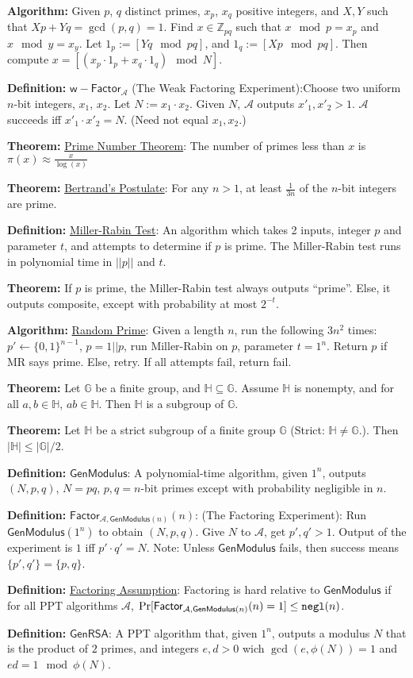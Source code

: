 \documentclass[10pt]{article}
\newcommand{\Z}{\mathbb{Z}}
\newcommand{\G}{\mathbb{G}}
\newcommand{\HH}{\mathbb{H}}
\newcommand{\AAA}{\mathcal{A}}
\newcommand{\defn}[1]{{\bf Definition:} \underline{#1}}
\newcommand{\thm}[1]{{\bf Theorem:} \underline{#1}}
\newcommand{\alg}[1]{{\bf Algorithm:} \underline{#1}}
\newcommand{\GenM}{\mathsf{GenModulus}}
\newcommand{\GenRSA}{\mathsf{GenRSA}}
\newcommand{\ExptFacArgs}[2]{\mathsf{Factor}_{#1,#2}}
\newcommand{\ExptWFacArgs}[1]{\mathsf{w-Factor}_{#1}}
\newcommand{\ExptFac}{\ExptFacArgs{\AAA}{\GenM(n)}}
\newcommand{\ExptWFac}{\ExptWFacArgs{\AAA}}
\newcommand{\negl}{{\tt negl}}
\newcommand{\from}{\leftarrow}
\begin{document}
\begin{multicols}{4}
\alg{}Given $p$, $q$ distinct primes, $x_p$, $x_q$ positive integers, and $X,Y$ such that $Xp+Yq=\gcd(p,q)=1$. Find $x\in\Z_{pq}$ such that $x\mod{p}=x_p$ and $x\mod{y}=x_y$. Let $1_p:=[Yq\mod{pq}]$, and $1_q:=[Xp\mod{pq}]$. Then compute $x=[(x_p\cdot 1_p+x_q\cdot 1_q)\mod{N}]$.

\defn{$\ExptWFac$} (The Weak Factoring Experiment):Choose two uniform $n$-bit integers, $x_1$, $x_2$. Let $N:=x_1\cdot x_2$. Given $N$, $\AAA$ outputs $x'_1,x'_2>1$. $\AAA$ succeeds iff $x'_1\cdot x'_2=N$. (Need not equal $x_1,x_2$.)

\thm{Prime Number Theorem}: The number of primes less than $x$ is $\pi(x)\approx\frac{x}{\log(x)}$

\thm{Bertrand's Postulate}: For any $n>1$, at least $\frac{1}{3n}$ of the $n$-bit integers are prime.

\defn{Miller-Rabin Test}: An algorithm which takes 2 inputs, integer $p$ and parameter $t$, and attempts to determine if $p$ is prime. The Miller-Rabin test runs in polynomial time in $||p||$ and $t$.

\thm{}If $p$ is prime, the Miller-Rabin test always outputs ``prime''. Else, it outputs composite, except with probability at most $2^{-t}$.

\alg{Random Prime}: Given a length $n$, run the following $3n^2$ times: $p'\from\{0,1\}^{n-1}$, $p=1||p$, run Miller-Rabin on $p$, parameter $t=1^n$. Return $p$ if MR says prime. Else, retry. If all attempts fail, return fail.

\thm{}Let $\G$ be a finite group, and $\HH\subseteq\G$. Assume $\HH$ is nonempty, and for all $a,b\in\HH$, $ab\in\HH$. Then $\HH$ is a subgroup of $\G$.

\thm{}Let $\HH$ be a strict subgroup of a finite group $\G$ (Strict: $\HH\neq \G$.). Then $|\HH|\leq|\G|/2$.

\defn{$\GenM$}: A polynomial-time algorithm, given $1^n$, outputs $(N,p,q)$, $N=pq$, $p,q=n$-bit primes except with probability negligible in $n$.

\defn{$\ExptFac(n)$}: (The Factoring Experiment): Run $\GenM(1^n)$ to obtain $(N,p,q)$. Give $N$ to $\AAA$, get $p',q'>1$. Output of the experiment is $1$ iff $p'\cdot q'=N$. Note: Unless $\GenM$ fails, then success means $\{p',q'\}=\{p,q\}$.

\defn{Factoring Assumption}: Factoring is hard relative to $\GenM$ if for all PPT algorithms $\AAA$, $\Pr[\ExptFac(n)=1]\leq\negl(n)$.

\defn{$\GenRSA$}: A PPT algorithm that, given $1^n$, outputs a modulus $N$ that is the product of $2$ primes, and integers $e,d>0$ wich $\gcd(e,\phi(N))=1$ and $ed=1\mod{\phi(N)}$.


\end{multicols}
\end{document}
